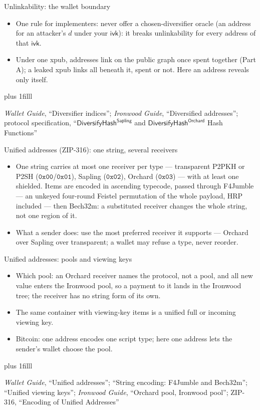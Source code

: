 \documentclass[aspectratio=169,11pt]{beamer}
\newcommand{\ivk}{\ensuremath{\mathsf{ivk}}}
\newcommand{\src}[1]{\par\vskip0pt plus 1filll
  {\fontsize{6}{7.2}\selectfont\color{arbdim}\raggedright #1\par}}
\begin{document}
\begin{frame}{Unlinkability: the wallet boundary}
\begin{itemize}
  \item One rule for implementers: never offer a chosen-diversifier
    oracle (an address for an attacker's $d$ under your \ivk): it breaks
    unlinkability for every address of that \ivk.
  \item Under one xpub, addresses link on the public graph once spent
    together (Part A); a leaked xpub links all beneath it, spent or not.
    Here an address reveals only itself.
\end{itemize}
\src{\emph{Wallet Guide}, ``Diversifier indices''; \emph{Ironwood Guide},
``Diversified addresses''; protocol specification,
``$\mathsf{DiversifyHash}^{\mathsf{Sapling}}$ and
$\mathsf{DiversifyHash}^{\mathsf{Orchard}}$ Hash Functions''}
\end{frame}

\begin{frame}{Unified addresses (ZIP-316): one string, several receivers}
\begin{itemize}
  \item One string carries at most one receiver per type --- transparent
    P2PKH or P2SH ($\mathtt{0x00}$/$\mathtt{0x01}$), Sapling
    ($\mathtt{0x02}$), Orchard ($\mathtt{0x03}$) --- with at least one
    shielded. Items are encoded in ascending typecode, passed through
    F4Jumble --- an unkeyed four-round Feistel permutation of the whole
    payload, HRP included --- then Bech32m: a substituted receiver
    changes the whole string, not one region of it.
  \item What a sender does: use the most preferred receiver it supports
    --- Orchard over Sapling over transparent; a wallet may refuse a type,
    never reorder.
\end{itemize}
\end{frame}

\begin{frame}{Unified addresses: pools and viewing keys}
\begin{itemize}
  \item Which pool: an Orchard receiver names the protocol, not a pool,
    and all new value enters the Ironwood pool, so a payment to it lands
    in the Ironwood tree; the receiver has no string form of its own.
  \item The same container with viewing-key items is a unified full or
    incoming viewing key.
  \item Bitcoin: one address encodes one script type; here one address
    lets the sender's wallet choose the pool.
\end{itemize}
\src{\emph{Wallet Guide}, ``Unified addresses''; ``String encoding:
F4Jumble and Bech32m''; ``Unified viewing keys''; \emph{Ironwood Guide},
``Orchard pool, Ironwood pool''; ZIP-316, ``Encoding of Unified Addresses''}
\end{frame}
\end{document}
